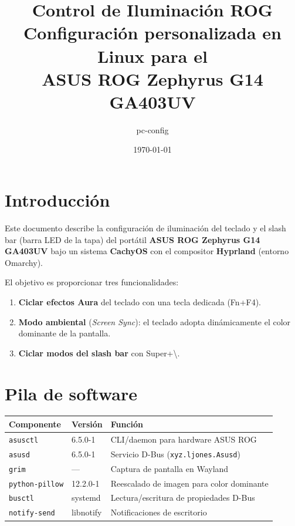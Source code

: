 \documentclass[12pt,a4paper]{article}
\title{%
  \textbf{Control de Iluminación ROG}\\[0.4em]
  \large Configuración personalizada en Linux para el\\
  ASUS ROG Zephyrus G14 GA403UV
}
\author{pc-config}
\date{\today}
\begin{document}
\maketitle
\tableofcontents
\newpage

\section{Introducción}

Este documento describe la configuración de iluminación del teclado y el slash
bar (barra LED de la tapa) del portátil \textbf{ASUS ROG Zephyrus G14 GA403UV}
bajo un sistema \textbf{CachyOS} con el compositor \textbf{Hyprland} (entorno
Omarchy).

El objetivo es proporcionar tres funcionalidades:

\begin{enumerate}
  \item \textbf{Ciclar efectos Aura} del teclado con una tecla dedicada (Fn+F4).
  \item \textbf{Modo ambiental} (\emph{Screen Sync}): el teclado adopta
        dinámicamente el color dominante de la pantalla.
  \item \textbf{Ciclar modos del slash bar} con Super+\textbackslash.
\end{enumerate}

\section{Pila de software}

\begin{center}
\begin{tabular}{lll}
  \toprule
  Componente & Versión & Función \\
  \midrule
  \texttt{asusctl} & 6.5.0-1 & CLI/daemon para hardware ASUS ROG \\
  \texttt{asusd}   & 6.5.0-1 & Servicio D-Bus (\texttt{xyz.ljones.Asusd}) \\
  \texttt{grim}    & ---      & Captura de pantalla en Wayland \\
  \texttt{python-pillow} & 12.2.0-1 & Reescalado de imagen para color dominante \\
  \texttt{busctl}  & systemd  & Lectura/escritura de propiedades D-Bus \\
  \texttt{notify-send} & libnotify & Notificaciones de escritorio \\
  \bottomrule
\end{tabular}
\end{center}
\end{document}

